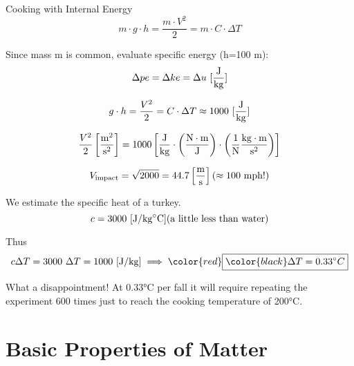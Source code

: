 \begin{example}{Cooking with Internal Energy}
\begin{equation*}
m \cdot g \cdot h=\frac{m \cdot {V}^2}{2} = m \cdot C \cdot \Delta T
\end{equation*}

Since mass m is common, evaluate specific energy (h=100 m):
\begin{equation*}
\Delta pe = \Delta ke = \Delta u \ [\frac{\rm J}{\rm kg}]
\end{equation*}

\begin{equation*}
g \cdot h = \frac{{V}^2}{2} = C \cdot \Delta T \approx 1000 \ [\frac{\rm J}{\rm kg}]
\end{equation*}

\begin{equation*}
\frac{{V}^2}{2} \left[\frac{\rm m^2}{\rm s^2}\right] =
1000 \left[ \frac{\rm J}{\rm kg} \cdot
\left(\frac{\rm N \cdot m}{\rm J}\right) \cdot \left(\frac{1}{\rm N} \frac{\rm kg \cdot m}{\rm s^2} \right)\right]
\end{equation*}

\begin{equation*}
{V}_{\text{impact}} = \sqrt{2000} = 44.7 \left[ \frac{\rm m}{\rm s}\right] (\approx 100 \ \rm mph !)
\end{equation*}

We estimate the specific heat of a turkey.
\begin{equation*}
c = 3000 \ [{\rm J / kg ^{\circ}C}] (\text{a little less than water})
\end{equation*}

Thus
\begin{equation*}
c \Delta T = 3000 \ \Delta T = 1000 \ [{\rm J / kg}] \implies \color{red}\boxed{\color{black} \Delta T = 0.33 ^{\circ}C}
\end{equation*}

What a disappointment! At 0.33°C per fall it will require repeating the experiment 600 times just to reach the cooking temperature of 200°C.

\end{example}

\section{Basic Properties of Matter}
